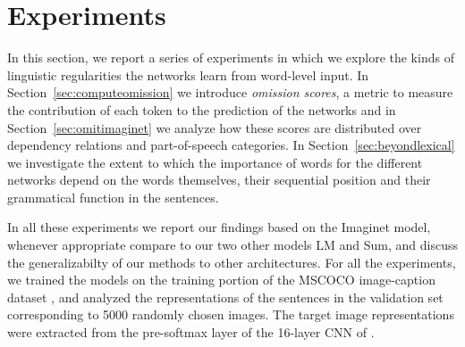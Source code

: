 \section{Experiments}
\label{sec:experiments}


In this section, we report a series of experiments in which
we explore the kinds of linguistic regularities the networks learn from
word-level input. 
In Section~\ref{sec:computeomission} we introduce \emph{omission scores},
a metric to measure the contribution of each token to the prediction
of the networks and in Section~\ref{sec:omitimaginet} we analyze how
these scores are distributed over dependency relations and
part-of-speech categories. 
In Section~\ref{sec:beyondlexical} we investigate the extent to which
the importance of words for the different networks depend on the words themselves,
their sequential position and their grammatical function in the sentences.

In all these experiments we report our findings based on the {\sc Imaginet}
model, whenever appropriate compare to our two other models {\sc LM} and {\sc Sum}, 
and discuss the generalizabilty of our methods to other architectures.
\label{edit:experimentsgeneral}
For all the experiments, we trained the models on the training portion of the
MSCOCO image-caption dataset \cite{lin2014microsoft}, and analyzed the
representations of the sentences in the validation set corresponding
to 5000 randomly chosen images. The target image representations were
extracted from the pre-softmax layer of the 16-layer CNN of
.





